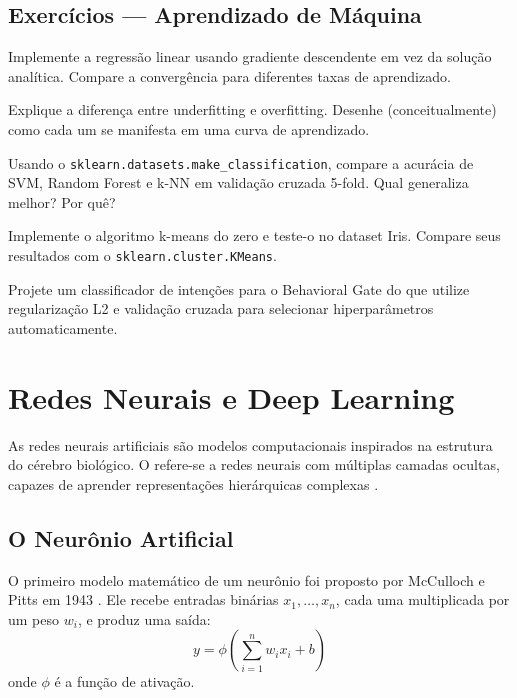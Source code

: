 \subsection{Exercícios — Aprendizado de Máquina}
\begin{exercicio}
Implemente a regressão linear usando gradiente descendente em vez da solução
analítica. Compare a convergência para diferentes taxas de aprendizado.
\end{exercicio}
\begin{exercicio}
Explique a diferença entre underfitting e overfitting. Desenhe (conceitualmente)
como cada um se manifesta em uma curva de aprendizado.
\end{exercicio}
\begin{exercicio}
Usando o \texttt{sklearn.datasets.make\_classification}, compare a acurácia
de SVM, Random Forest e k-NN em validação cruzada 5-fold. Qual generaliza
melhor? Por quê?
\end{exercicio}
\begin{exercicio}
Implemente o algoritmo k-means do zero e teste-o no dataset Iris. Compare
seus resultados com o \texttt{sklearn.cluster.KMeans}.
\end{exercicio}
\begin{exercicio}
Projete um classificador de intenções para o Behavioral Gate do
\opencodeeco{} que utilize regularização L2 e validação cruzada para
selecionar hiperparâmetros automaticamente.
\end{exercicio}
\section{Redes Neurais e Deep Learning}
\label{sec:redes-neurais}
\nivelintermediario
As redes neurais artificiais são modelos computacionais inspirados na
estrutura do cérebro biológico. O  refere-se a
redes neurais com múltiplas camadas ocultas, capazes de aprender
representações hierárquicas complexas \cite{goodfellow2016deep,
lecun2015deep}.
\subsection{O Neurônio Artificial}
\begin{definicao}
O primeiro modelo matemático de um neurônio foi proposto por McCulloch e
Pitts em 1943 \cite{mcculloch1943logical}. Ele recebe entradas binárias
$x_1, \ldots, x_n$, cada uma multiplicada por um peso $w_i$, e produz uma
saída:
\[y = \phi\left(\sum_{i=1}^n w_i x_i + b\right)
\]
onde $\phi$ é a função de ativação.
\end{definicao}
